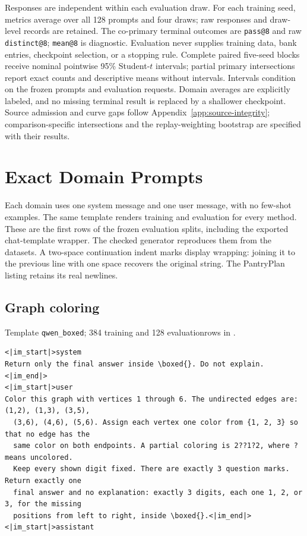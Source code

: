 \documentclass{article}
\newcommand{\1}{\mathbf 1}
\theoremstyle{remark}
\theoremstyle{definition}
\theoremstyle{plain}
\begin{document}
Responses are independent within each evaluation draw. For each training
seed, metrics average over all 128 prompts and four draws; raw responses
and draw-level records are retained. The co-primary terminal outcomes are
\texttt{pass@8} and raw \texttt{distinct@8}; \texttt{mean@8} is diagnostic.
Evaluation never supplies training data, bank entries, checkpoint selection,
or a stopping rule. Complete paired five-seed blocks receive nominal
pointwise 95\% Student-$t$ intervals; partial primary intersections report
exact counts and descriptive means without intervals. Intervals condition
on the frozen prompts and evaluation requests. Domain averages are
explicitly labeled, and no missing terminal result is replaced by a
shallower checkpoint. Source admission and curve gaps follow
Appendix~\ref{app:source-integrity}; comparison-specific intersections and
the replay-weighting bootstrap are specified with their results.

\section{Exact Domain Prompts}
\label{app:prompts}

Each domain uses one system message and one user message, with no few-shot
examples. The same template renders training and evaluation for every
method. These are the first rows of the frozen evaluation splits, including
the exported chat-template wrapper. The checked generator
 reproduces them from the datasets.
A two-space continuation indent marks display wrapping: joining it to the
previous line with one space recovers the original string. The PantryPlan
listing retains its real newlines.


\subsection{Graph coloring}
\label{app:prompt-graph}

\noindent Template \texttt{qwen\_boxed}; 384 training and 128 evaluation\linebreak rows in .

\begin{Verbatim}[fontsize=\scriptsize,frame=single,framesep=4pt,rulecolor=\color{black!25}]
<|im_start|>system
Return only the final answer inside \boxed{}. Do not explain.<|im_end|>
<|im_start|>user
Color this graph with vertices 1 through 6. The undirected edges are: (1,2), (1,3), (3,5),
  (3,6), (4,6), (5,6). Assign each vertex one color from {1, 2, 3} so that no edge has the
  same color on both endpoints. A partial coloring is 2??1?2, where ? means uncolored.
  Keep every shown digit fixed. There are exactly 3 question marks. Return exactly one
  final answer and no explanation: exactly 3 digits, each one 1, 2, or 3, for the missing
  positions from left to right, inside \boxed{}.<|im_end|>
<|im_start|>assistant
\end{Verbatim}
\end{document}
